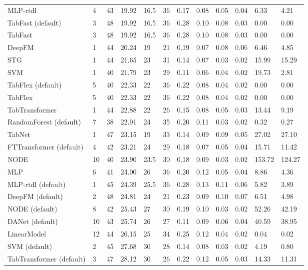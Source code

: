 \begin{tabular}{lllllrllllll}
MLP-rtdl & 4 & 43 & 19.92 & 16.5 & 36 & 0.17 & 0.08 & 0.05 & 0.04 & 6.33 & 4.21 \\
TabFast (default) & 3 & 48 & 19.92 & 16.5 & 36 & 0.28 & 0.10 & 0.08 & 0.03 & 0.00 & 0.00 \\
TabFast & 3 & 48 & 19.92 & 16.5 & 36 & 0.28 & 0.10 & 0.08 & 0.03 & 0.00 & 0.00 \\
DeepFM & 1 & 44 & 20.24 & 19 & 21 & 0.19 & 0.07 & 0.08 & 0.06 & 6.46 & 4.85 \\
STG & 1 & 44 & 21.65 & 23 & 31 & 0.14 & 0.07 & 0.03 & 0.02 & 15.99 & 15.29 \\
SVM & 1 & 40 & 21.79 & 23 & 29 & 0.11 & 0.06 & 0.04 & 0.02 & 19.73 & 2.81 \\
TabFlex (default) & 5 & 40 & 22.33 & 22 & 36 & 0.22 & 0.08 & 0.04 & 0.02 & 0.00 & 0.00 \\
TabFlex & 5 & 40 & 22.33 & 22 & 36 & 0.22 & 0.08 & 0.04 & 0.02 & 0.00 & 0.00 \\
TabTransformer & 1 & 44 & 22.88 & 22 & 26 & 0.15 & 0.08 & 0.05 & 0.03 & 13.44 & 9.19 \\
RandomForest (default) & 7 & 38 & 22.91 & 24 & 35 & 0.20 & 0.11 & 0.03 & 0.02 & 0.32 & 0.27 \\
TabNet & 1 & 47 & 23.15 & 19 & 33 & 0.14 & 0.09 & 0.09 & 0.05 & 27.02 & 27.10 \\
FTTransformer (default) & 4 & 42 & 23.21 & 24 & 29 & 0.18 & 0.07 & 0.05 & 0.04 & 15.71 & 11.42 \\
NODE & 10 & 40 & 23.90 & 23.5 & 30 & 0.18 & 0.09 & 0.03 & 0.02 & 153.72 & 124.27 \\
MLP & 6 & 41 & 24.00 & 26 & 36 & 0.20 & 0.12 & 0.05 & 0.04 & 8.86 & 4.36 \\
MLP-rtdl (default) & 1 & 45 & 24.39 & 25.5 & 36 & 0.28 & 0.13 & 0.11 & 0.06 & 5.82 & 3.89 \\
DeepFM (default) & 2 & 48 & 24.81 & 24 & 21 & 0.23 & 0.09 & 0.10 & 0.07 & 6.51 & 4.98 \\
NODE (default) & 8 & 42 & 25.43 & 27 & 30 & 0.19 & 0.10 & 0.03 & 0.02 & 52.26 & 42.19 \\
DANet (default) & 10 & 43 & 25.74 & 26 & 27 & 0.11 & 0.09 & 0.06 & 0.04 & 40.59 & 38.95 \\
LinearModel & 12 & 44 & 26.15 & 25 & 34 & 0.25 & 0.12 & 0.04 & 0.02 & 0.04 & 0.02 \\
SVM (default) & 2 & 45 & 27.68 & 30 & 28 & 0.14 & 0.08 & 0.03 & 0.02 & 4.19 & 0.80 \\
TabTransformer (default) & 3 & 47 & 28.12 & 30 & 26 & 0.22 & 0.12 & 0.05 & 0.03 & 14.33 & 11.31 \\

\end{tabular}
